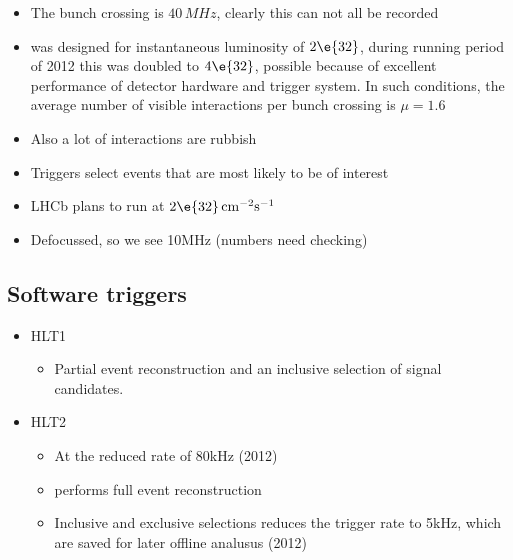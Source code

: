 \begin{itemize}
  \item The bunch crossing is $40\,MHz$, clearly this can not all be recorded
  \item \lhcb was designed for instantaneous luminosity of $2\e{32}$, during
    running period of 2012 this was doubled to $4\e{32}$, possible because of
    excellent performance of detector hardware and trigger system. In such
    conditions, the average number of visible interactions per bunch crossing is $\mu=1.6$
  \item Also a lot of interactions are rubbish
  \item Triggers select events that are most likely to be of interest
  \item LHCb plans to run at $2\e{32}\,\mathrm{cm}^{-2}\mathrm{s}^{-1}$
  \item Defocussed, so we see 10MHz (numbers need checking)
\end{itemize}





\subsection{Software triggers}
\begin{itemize}
  \item HLT1
    \begin{itemize}
      \item Partial event reconstruction and an inclusive selection of signal
        candidates.
    \end{itemize}
  \item HLT2
    \begin{itemize}
      \item At the reduced rate of 80kHz (2012)
      \item performs full event reconstruction
      \item Inclusive and exclusive selections reduces the trigger rate to
        5kHz, which are saved for later offline analusus (2012)
    \end{itemize}
\end{itemize}


